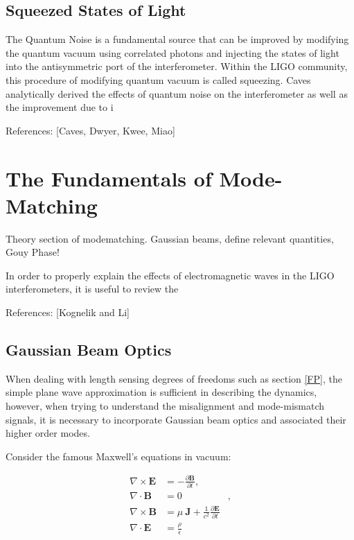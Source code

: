 \documentclass[oneside]{book}
\begin{document}
	\section{Squeezed States of Light}
	The Quantum Noise is a fundamental source that can be improved by modifying the quantum vacuum using correlated photons and injecting the states of light into the antisymmetric port of the interferometer.  Within the LIGO community, this procedure of modifying quantum vacuum is called squeezing. Caves analytically derived the effects of quantum noise on the interferometer as well as the improvement due to i
	
	References: [Caves, Dwyer, Kwee, Miao]
		
\chapter{The Fundamentals of Mode-Matching}
	Theory section of modematching. Gaussian beams, define relevant quantities, Gouy Phase!
	
	In order to properly explain the effects of electromagnetic waves in the LIGO interferometers, it is useful to review the 
	
	References: [Kognelik and Li]
	
		\section{Gaussian Beam Optics}
		When dealing with length sensing degrees of freedoms such as section \ref{FP}, the simple plane wave approximation is sufficient in describing the dynamics, however, when trying to understand the misalignment and mode-mismatch signals, it is necessary to incorporate Gaussian beam optics and associated their higher order modes.

		
		Consider the famous Maxwell's equations in vacuum:
		
		\begin{equation}
		\label{18.1:1}
		\begin{aligned}
		 \nabla \times \mathbf{E} &=-\frac{\partial \mathbf{B}} {\partial t},&
		\\\nabla \cdot \mathbf{B} &=0&,
		\\\nabla \times \mathbf{B} &= \mu\ \mathbf{J} + \frac{1}{c^2} \frac{\partial \mathbf{E}} {\partial t}&
		\\
		\nabla \cdot \mathbf{E} &= \frac{\rho}{\epsilon}&
		\end{aligned}
		\end{equation}
		
\end{document}
